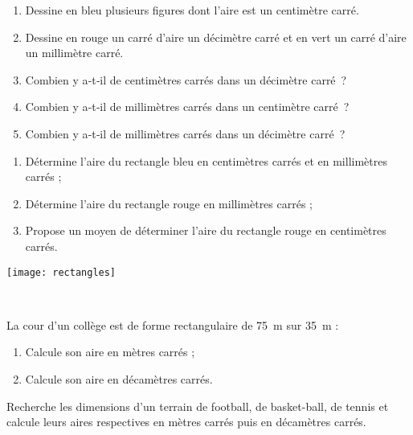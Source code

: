 \begin{activite}
\begin{partie}
\begin{enumerate}
 \item Dessine en bleu plusieurs figures dont l'aire est un centimètre carré.
 \item Dessine en rouge un carré d'aire un décimètre carré et en vert un carré d'aire un millimètre carré.
 \item Combien y a‑t‑il de centimètres carrés dans un décimètre carré ?
 \item Combien y a‑t‑il de millimètres carrés dans un centimètre carré ?
 \item Combien y a‑t‑il de millimètres carrés dans un décimètre carré ?
 \end{enumerate}
\end{partie}

\begin{partie}
\begin{minipage}[c]{0.36\linewidth}
\begin{enumerate}
 \item Détermine l'aire du rectangle bleu en centimètres carrés et en millimètres carrés ;
 \item Détermine l'aire du rectangle rouge en millimètres carrés ;
 \item Propose un moyen de déterminer l'aire du rectangle rouge en centimètres carrés.
 \end{enumerate}
 \end{minipage} \hfill%
 \begin{minipage}[c]{0.6\linewidth}
  \texttt{[image: rectangles]}
  \end{minipage} \\
\end{partie}

\begin{partie}
La cour d'un collège est de forme rectangulaire de 75 m sur 35 m :
\begin{enumerate}
 \item Calcule son aire en mètres carrés ;
 \item Calcule son aire en décamètres carrés.
 \end{enumerate}
\end{partie}

\begin{partie}
Recherche les dimensions d'un terrain de football, de basket-ball, de tennis et calcule leurs aires respectives en mètres carrés puis en décamètres carrés.
\end{partie}

\end{activite}

